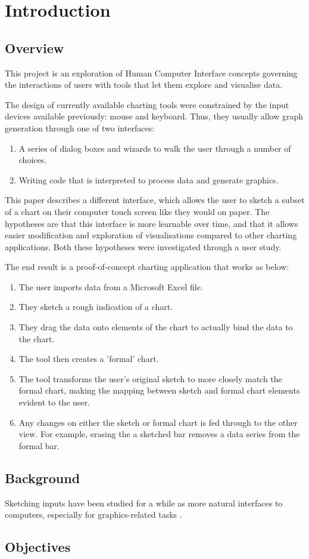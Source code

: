 \chapter{Introduction}
\section{Overview}
This project is an exploration of Human Computer Interface concepts governing the interactions of users with tools that let them explore and visualise data.

The design of currently available charting tools were constrained by the input devices available previously: mouse and keyboard. Thus, they usually allow graph generation through one of two interfaces:
\begin{enumerate}
\item A series of dialog boxes and wizards to walk the user through a number of choices.
\item Writing code that is interpreted to process data and generate graphics.
\end{enumerate}
This paper describes a different interface, which allows the user to sketch a subset of a chart on their computer touch screen like they would on paper. The hypotheses are that this interface is more learnable over time, and that it allows easier modification and exploration of visualisations compared to other charting applications. Both these hypotheses were investigated through a user study.

The end result is a proof-of-concept charting application that works as below:
\begin{enumerate}
\item The user imports data from a Microsoft Excel file.
\item They sketch a rough indication of a chart.
\item They drag the data onto elements of the chart to actually bind the data to the chart. 
\item The tool then creates a 'formal' chart.
\item The tool transforms the user's original sketch to more closely match the formal chart, making the mapping between sketch and formal chart elements evident to the user.
\item Any changes on either the sketch or formal chart is fed through to the other view. For example, erasing the a sketched bar removes a data series from the formal bar.
\end{enumerate}

\section{Background}
Sketching inputs have been studied for a while as more natural interfaces to computers, especially for graphics-related tasks \citep{Sutherland1964}.
\section{Objectives}